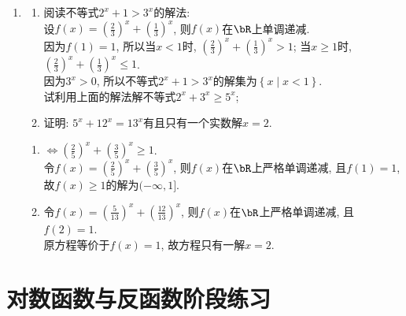 \begin{enumerate}
\begin{enumerate}
\item 
\begin{enumerate}[(1)]
\item 阅读不等式$2^x+1>3^x$的解法: \\
设$f(x)=(\frac{2}{3})^x+(\frac{1}{3})^x$, 则$f(x)$在$\bR$上单调递减. \\
因为$f(1)=1$, 所以当$x<1$时, $(\frac{2}{3})^x+(\frac{1}{3})^x>1$; 当$x\geq 1$时, $(\frac{2}{3})^x+(\frac{1}{3})^x\leq 1$.\\
因为$3^x>0$, 所以不等式$2^x+1>3^x$的解集为$\left\{x\mid x<1\right\}$. \\
试利用上面的解法解不等式$2^x+3^x\geq 5^x$; 

\item 证明: $5^x+12^x=13^x$有且只有一个实数解$x=2$. 
\end{enumerate}
\begin{jieda}
\begin{enumerate}[(1)]
\item $\iff(\frac{2}{5})^x+(\frac{3}{5})^x\geq 1$. \\
令$f(x)=(\frac{2}{5})^x+(\frac{3}{5})^x$, 则$f(x)$在$\bR$上严格单调递减, 且$f(1)=1$, \\
故$f(x)\geq 1$的解为$(-\infty,1]$. 

\item 令$f(x)=(\frac{5}{13})^x+(\frac{12}{13})^x$, 则$f(x)$在$\bR$上严格单调递减, 且$f(2)=1$. \\
原方程等价于$f(x)=1$, 故方程只有一解$x=2$. 
\end{enumerate}
\end{jieda}


\end{enumerate}

\end{enumerate}


 \section*{对数函数与反函数阶段练习}

